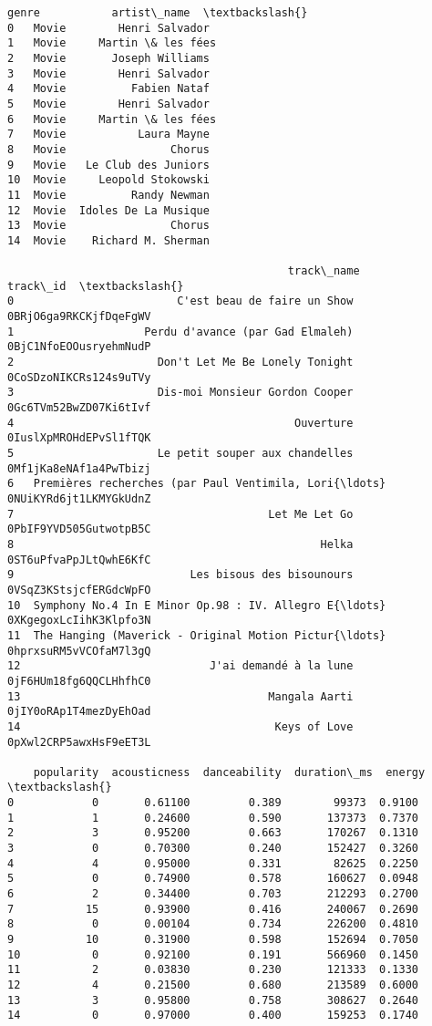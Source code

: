 \documentclass[11pt]{article}
\makeatletter
\newcommand{\boxspacing}{\kern\kvtcb@left@rule\kern\kvtcb@boxsep}
\newcommand{\prompt}[4]{
        {\ttfamily\llap{{\color{#2}[#3]:\hspace{3pt}#4}}\vspace{-\baselineskip}}
    }
\makeatother
\begin{document}
            \begin{tcolorbox}[breakable, size=fbox, boxrule=.5pt, pad at break*=1mm, opacityfill=0]
\prompt{Out}{outcolor}{31}{\boxspacing}
\begin{Verbatim}[commandchars=\\\{\}]
    genre           artist\_name  \textbackslash{}
0   Movie        Henri Salvador
1   Movie     Martin \& les fées
2   Movie       Joseph Williams
3   Movie        Henri Salvador
4   Movie          Fabien Nataf
5   Movie        Henri Salvador
6   Movie     Martin \& les fées
7   Movie           Laura Mayne
8   Movie                Chorus
9   Movie   Le Club des Juniors
10  Movie     Leopold Stokowski
11  Movie          Randy Newman
12  Movie  Idoles De La Musique
13  Movie                Chorus
14  Movie    Richard M. Sherman

                                           track\_name                track\_id  \textbackslash{}
0                         C'est beau de faire un Show  0BRjO6ga9RKCKjfDqeFgWV
1                    Perdu d'avance (par Gad Elmaleh)  0BjC1NfoEOOusryehmNudP
2                      Don't Let Me Be Lonely Tonight  0CoSDzoNIKCRs124s9uTVy
3                      Dis-moi Monsieur Gordon Cooper  0Gc6TVm52BwZD07Ki6tIvf
4                                           Ouverture  0IuslXpMROHdEPvSl1fTQK
5                      Le petit souper aux chandelles  0Mf1jKa8eNAf1a4PwTbizj
6   Premières recherches (par Paul Ventimila, Lori{\ldots}  0NUiKYRd6jt1LKMYGkUdnZ
7                                       Let Me Let Go  0PbIF9YVD505GutwotpB5C
8                                               Helka  0ST6uPfvaPpJLtQwhE6KfC
9                           Les bisous des bisounours  0VSqZ3KStsjcfERGdcWpFO
10  Symphony No.4 In E Minor Op.98 : IV. Allegro E{\ldots}  0XKgegoxLcIihK3Klpfo3N
11  The Hanging (Maverick - Original Motion Pictur{\ldots}  0hprxsuRM5vVCOfaM7l3gQ
12                             J'ai demandé à la lune  0jF6HUm18fg6QQCLHhfhC0
13                                      Mangala Aarti  0jIY0oRAp1T4mezDyEhOad
14                                       Keys of Love  0pXwl2CRP5awxHsF9eET3L

    popularity  acousticness  danceability  duration\_ms  energy  \textbackslash{}
0            0       0.61100         0.389        99373  0.9100
1            1       0.24600         0.590       137373  0.7370
2            3       0.95200         0.663       170267  0.1310
3            0       0.70300         0.240       152427  0.3260
4            4       0.95000         0.331        82625  0.2250
5            0       0.74900         0.578       160627  0.0948
6            2       0.34400         0.703       212293  0.2700
7           15       0.93900         0.416       240067  0.2690
8            0       0.00104         0.734       226200  0.4810
9           10       0.31900         0.598       152694  0.7050
10           0       0.92100         0.191       566960  0.1450
11           2       0.03830         0.230       121333  0.1330
12           4       0.21500         0.680       213589  0.6000
13           3       0.95800         0.758       308627  0.2640
14           0       0.97000         0.400       159253  0.1740


\end{Verbatim}
\end{tcolorbox}
\end{document}
